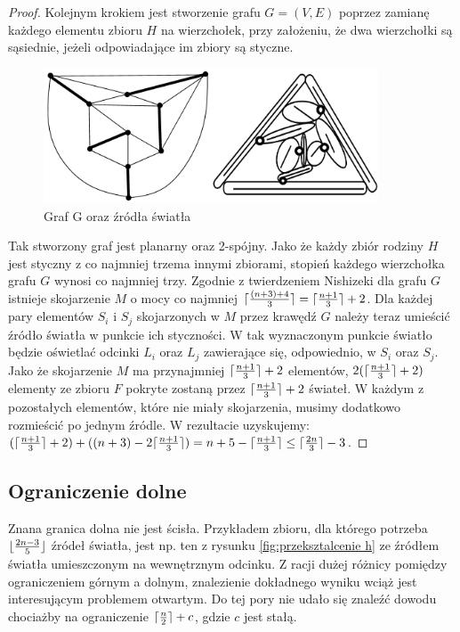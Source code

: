 \documentclass[brudnopis]{xmgr}
\DeclarePairedDelimiter\ceil{\lceil}{\rceil}
\DeclarePairedDelimiter\floor{\lfloor}{\rfloor}
\theoremstyle{definition}
\begin{document}
\begin{proof}
\indent Kolejnym krokiem jest stworzenie grafu $G=(V,E)$ poprzez zamianę każdego elementu zbioru $H$ na wierzchołek, przy założeniu, że dwa wierzchołki są sąsiednie, jeżeli odpowiadające im zbiory są styczne.
\begin{figure}[ht!]
 \centering
  \includegraphics[height=4cm]{rysunki/skojarzenia_zrodla_swiatla.png}
  \caption{Graf G oraz źródła światła}
\end{figure}
Tak stworzony graf jest planarny oraz 2-spójny. Jako że każdy zbiór rodziny $H$ jest styczny z co najmniej trzema innymi zbiorami, stopień każdego wierzchołka grafu $G$ wynosi co najmniej trzy. Zgodnie z twierdzeniem Nishizeki \cite{nishizeki} dla grafu $G$ istnieje skojarzenie $M$ o mocy co najmniej $\ceil{\frac{(n+3)+4}{3}} = \ceil{\frac{n+1}{3}}  + 2$. Dla każdej pary elementów $S_i$ i $S_j$ skojarzonych w $M$ przez krawędź $G$ należy teraz umieścić źródło światła w punkcie ich styczności. W tak wyznaczonym punkcie światło będzie oświetlać odcinki $L_i$ oraz $L_j$ zawierające się, odpowiednio, w $S_i$ oraz $S_j$. Jako że skojarzenie $M$ ma przynajmniej $\ceil{\frac{n+1}{3}} + 2$ elementów, $2(\ceil{\frac{n+1}{3}} + 2)$ elementy ze zbioru $F$ pokryte zostaną przez $\ceil{\frac{n+1}{3}} + 2$ świateł. W każdym z pozostałych elementów, które nie miały skojarzenia, musimy dodatkowo rozmieścić po jednym źródle. W rezultacie uzyskujemy:
$(\ceil{\frac{n+1}{3}} + 2) + ((n + 3) - 2\ceil{\frac{n+1}{3}}) = n + 5 - \ceil{\frac{n+1}{3}} \le \ceil{\frac{2n}{3}} - 3$.
\end{proof}

\subsection{Ograniczenie dolne}
\indent Znana granica dolna nie jest ścisła. Przykładem zbioru, dla którego potrzeba $\floor{\frac{2n-3}{5}}$ źródeł światła, jest np. ten z rysunku \ref{fig:przeksztalcenie h} ze źródłem światła umieszczonym na wewnętrznym odcinku. Z racji dużej różnicy pomiędzy ograniczeniem górnym a dolnym, znalezienie dokładnego wyniku wciąż jest interesującym problemem otwartym. Do tej pory nie udało się znaleźć dowodu chociażby na ograniczenie $\ceil{\frac{n}{2}} + c$, gdzie $c$ jest stałą.
\end{document}
